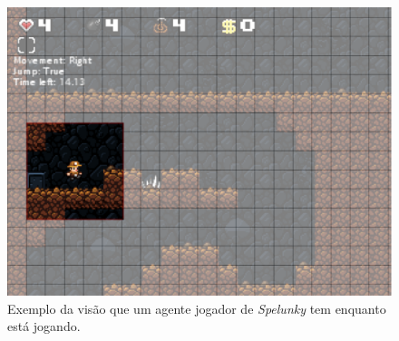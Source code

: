 \begin{figure}[htb!]
\centering
\includegraphics[width=.65\textwidth]{fig/spelunkbots-bot-vision.pdf}
\caption{\label{fig:vision-limitation}Exemplo da visão que um agente jogador de
\textit{Spelunky} tem enquanto está jogando.}
\end{figure}

